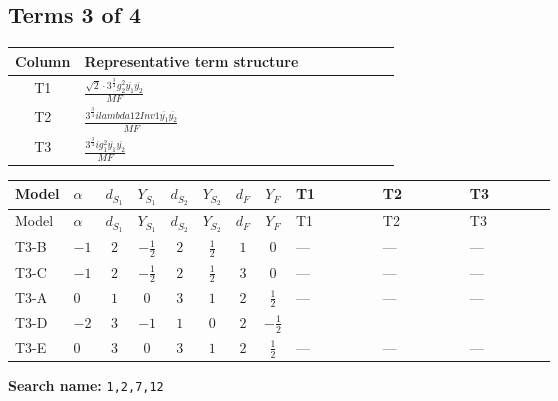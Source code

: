\documentclass[8pt]{article}
\begin{document}
\begin{landscape}
\subsection*{Terms 3 of 4}
\begin{center}
\begin{tabular}{@{}c >{\raggedright\arraybackslash}p{0.82\linewidth}@{}}
\toprule
Column & Representative term structure \\
\midrule
T1 & \(\displaystyle \frac{\sqrt{2} \cdot 3^{\frac{3}{4}} g_{2}^{2} \overline{y_{1}} \overline{y_{2}}}{MF}\) \\
\midrule
T2 & \(\displaystyle \frac{3^{\frac{3}{4}} i lambda12Inv1 \overline{y_{1}} \overline{y_{2}}}{MF}\) \\
\midrule
T3 & \(\displaystyle \frac{3^{\frac{3}{4}} i g_{1}^{2} \overline{y_{1}} \overline{y_{2}}}{MF}\) \\
\midrule
\bottomrule
\end{tabular}
\end{center}
\smallskip
\tiny
\begin{longtable}{@{}llcccccc >{\raggedright\arraybackslash}p{0.21\linewidth} >{\raggedright\arraybackslash}p{0.21\linewidth} >{\raggedright\arraybackslash}p{0.21\linewidth}@{}}
\toprule
Model & $\alpha$ & $d_{S_1}$ & $Y_{S_1}$ & $d_{S_2}$ & $Y_{S_2}$ & $d_F$ & $Y_F$ & T1 & T2 & T3 \\
\midrule
\endfirsthead
\toprule
Model & $\alpha$ & $d_{S_1}$ & $Y_{S_1}$ & $d_{S_2}$ & $Y_{S_2}$ & $d_F$ & $Y_F$ & T1 & T2 & T3 \\
\midrule
\endhead
T3-B & $-1$ & $2$ & $-\frac{1}{2}$ & $2$ & $\frac{1}{2}$ & $1$ & $0$ & --- & --- & --- \\
\midrule
T3-C & $-1$ & $2$ & $-\frac{1}{2}$ & $2$ & $\frac{1}{2}$ & $3$ & $0$ & --- & --- & --- \\
\midrule
T3-A & $0$ & $1$ & $0$ & $3$ & $1$ & $2$ & $\frac{1}{2}$ & --- & --- & --- \\
\midrule
T3-D & $-2$ & $3$ & $-1$ & $1$ & $0$ & $2$ & $-\frac{1}{2}$ & \scriptsize\adjustbox{max width=\linewidth}{$\begin{gathered} - \frac{\sqrt{2} \cdot 3^{\frac{3}{4}} g_{2}^{2} \overline{y_{1}} \overline{y_{2}}}{6 MF}\end{gathered}$} & \scriptsize\adjustbox{max width=\linewidth}{$\begin{gathered} \frac{3^{\frac{3}{4}} i lambda12Inv1 \overline{y_{1}} \overline{y_{2}}}{6 MF}\end{gathered}$} & \scriptsize\adjustbox{max width=\linewidth}{$\begin{gathered} \frac{3^{\frac{3}{4}} i g_{1}^{2} \overline{y_{1}} \overline{y_{2}}}{8 MF}\end{gathered}$} \\
\midrule
T3-E & $0$ & $3$ & $0$ & $3$ & $1$ & $2$ & $\frac{1}{2}$ & --- & --- & --- \\
\midrule
\bottomrule
\end{longtable}
\clearpage
\noindent\textbf{Search name: }\texttt{1,2,7,12}\par\smallskip

\end{landscape}
\end{document}
